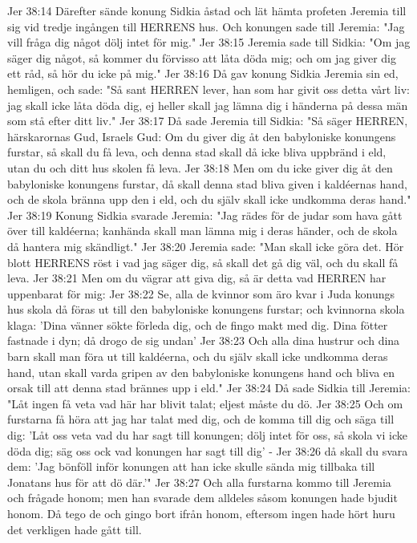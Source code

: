 Jer 38:14  Därefter sände konung Sidkia åstad och lät hämta profeten Jeremia till sig vid tredje ingången till HERRENS hus. Och konungen sade till Jeremia: "Jag vill fråga dig något dölj intet för mig."
Jer 38:15  Jeremia sade till Sidkia: "Om jag säger dig något, så kommer du förvisso att låta döda mig; och om jag giver dig ett råd, så hör du icke på mig."
Jer 38:16  Då gav konung Sidkia Jeremia sin ed, hemligen, och sade: "Så sant HERREN lever, han som har givit oss detta vårt liv: jag skall icke låta döda dig, ej heller skall jag lämna dig i händerna på dessa män som stå efter ditt liv."
Jer 38:17  Då sade Jeremia till Sidkia: "Så säger HERREN, härskarornas Gud, Israels Gud: Om du giver dig åt den babyloniske konungens furstar, så skall du få leva, och denna stad skall då icke bliva uppbränd i eld, utan du och ditt hus skolen få leva.
Jer 38:18  Men om du icke giver dig åt den babyloniske konungens furstar, då skall denna stad bliva given i kaldéernas hand, och de skola bränna upp den i eld, och du själv skall icke undkomma deras hand."
Jer 38:19  Konung Sidkia svarade Jeremia: "Jag rädes för de judar som hava gått över till kaldéerna; kanhända skall man lämna mig i deras händer, och de skola då hantera mig skändligt."
Jer 38:20  Jeremia sade: "Man skall icke göra det. Hör blott HERRENS röst i vad jag säger dig, så skall det gå dig väl, och du skall få leva.
Jer 38:21  Men om du vägrar att giva dig, så är detta vad HERREN har uppenbarat för mig:
Jer 38:22  Se, alla de kvinnor som äro kvar i Juda konungs hus skola då föras ut till den babyloniske konungens furstar; och kvinnorna skola klaga: 'Dina vänner sökte förleda dig, och de fingo makt med dig. Dina fötter fastnade i dyn; då drogo de sig undan'
Jer 38:23  Och alla dina hustrur och dina barn skall man föra ut till kaldéerna, och du själv skall icke undkomma deras hand, utan skall varda gripen av den babyloniske konungens hand och bliva en orsak till att denna stad brännes upp i eld."
Jer 38:24  Då sade Sidkia till Jeremia: "Låt ingen få veta vad här har blivit talat; eljest måste du dö.
Jer 38:25  Och om furstarna få höra att jag har talat med dig, och de komma till dig och säga till dig: 'Låt oss veta vad du har sagt till konungen; dölj intet för oss, så skola vi icke döda dig; säg oss ock vad konungen har sagt till dig' -
Jer 38:26  då skall du svara dem: 'Jag bönföll inför konungen att han icke skulle sända mig tillbaka till Jonatans hus för att dö där.'"
Jer 38:27  Och alla furstarna kommo till Jeremia och frågade honom; men han svarade dem alldeles såsom konungen hade bjudit honom. Då tego de och gingo bort ifrån honom, eftersom ingen hade hört huru det verkligen hade gått till.
